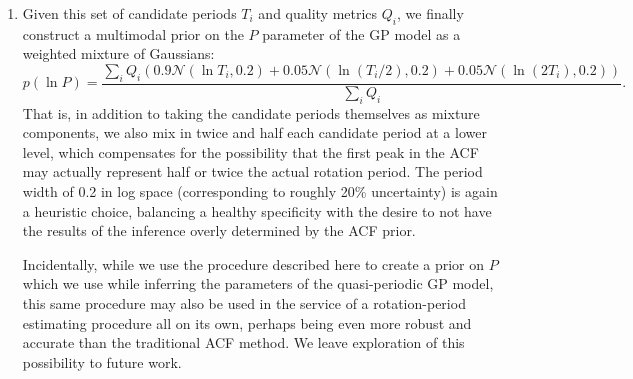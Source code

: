 \documentclass[useAMS, usenatbib, preprint, 12pt]{aastex}
\begin{document}
\begin{enumerate}
{\begin{enumerate}[(a)]
    \end{enumerate}
}

\item{Given this set of candidate periods $T_i$ and quality metrics $Q_i$,
we finally construct a multimodal prior on the $P$ parameter of the GP
model as a weighted mixture of Gaussians:
\begin{equation}
\label{eq:mixture}
p(\ln P) = \frac {\displaystyle \sum_i Q_i \left(0.9\mathcal N(\ln T_i, 0.2) +
                                          0.05\mathcal N(\ln (T_i/2), 0.2) +
                                          0.05\mathcal N(\ln (2 T_i), 0.2) \right)}
                {\sum_i Q_i}.
\end{equation}
That is, in addition to taking the candidate periods themselves as mixture
components, we also mix in twice and half each candidate period at a lower level,
which compensates for the possibility that the first peak in the ACF may actually
represent half or twice the actual rotation period.  The period width of 0.2 in
log space (corresponding to roughly 20\% uncertainty) is again a heuristic choice,
balancing a healthy specificity with the desire to not have the results of
the inference overly determined by the ACF prior.
}

Incidentally, while we use the procedure described here to create a prior on
$P$ which we use while inferring the parameters of the quasi-periodic GP model,
this same procedure may also be used in the service of a
rotation-period estimating procedure all on its own, perhaps being even more
robust and accurate than the traditional ACF method.  We leave exploration of
this possibility to future work.

\end{enumerate}






\end{document}

